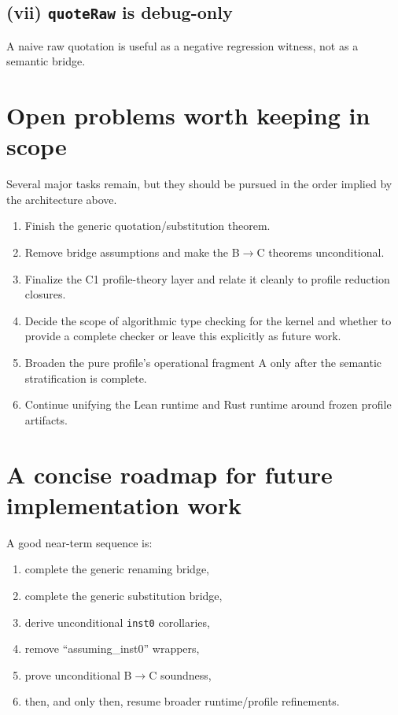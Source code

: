 \documentclass[11pt]{article}
\begin{document}
\subsection*{(vii) \texttt{quoteRaw} is debug-only}
A naive raw quotation is useful as a negative regression witness, not as a semantic bridge.

\section{Open problems worth keeping in scope}

Several major tasks remain, but they should be pursued in the order implied by the architecture above.

\begin{enumerate}
  \item Finish the generic quotation/substitution theorem.
  \item Remove bridge assumptions and make the B\(\to\)C theorems unconditional.
  \item Finalize the C1 profile-theory layer and relate it cleanly to profile reduction closures.
  \item Decide the scope of algorithmic type checking for the kernel and whether to provide a complete checker or leave this explicitly as future work.
  \item Broaden the pure profile's operational fragment A only after the semantic stratification is complete.
  \item Continue unifying the Lean runtime and Rust runtime around frozen profile artifacts.
\end{enumerate}

\section{A concise roadmap for future implementation work}

A good near-term sequence is:

\begin{enumerate}
  \item complete the generic renaming bridge,
  \item complete the generic substitution bridge,
  \item derive unconditional \texttt{inst0} corollaries,
  \item remove ``assuming\_inst0'' wrappers,
  \item prove unconditional B\(\to\)C soundness,
  \item then, and only then, resume broader runtime/profile refinements.
\end{enumerate}
\end{document}
